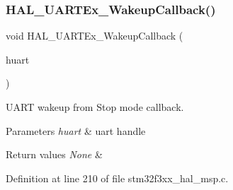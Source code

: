 \subsubsection{H\+A\+L\+\_\+\+U\+A\+R\+T\+Ex\+\_\+\+Wakeup\+Callback()}
{\footnotesize\ttfamily void H\+A\+L\+\_\+\+U\+A\+R\+T\+Ex\+\_\+\+Wakeup\+Callback (\begin{DoxyParamCaption}\item[{U\+A\+R\+T\+\_\+\+Handle\+Type\+Def $\ast$}]{huart }\end{DoxyParamCaption})}



U\+A\+RT wakeup from Stop mode callback. 


\begin{DoxyParams}{Parameters}
{\em huart} & uart handle \\
\hline
\end{DoxyParams}

\begin{DoxyRetVals}{Return values}
{\em None} & \\
\hline
\end{DoxyRetVals}


Definition at line 210 of file stm32f3xx\+\_\+hal\+\_\+msp.\+c.

